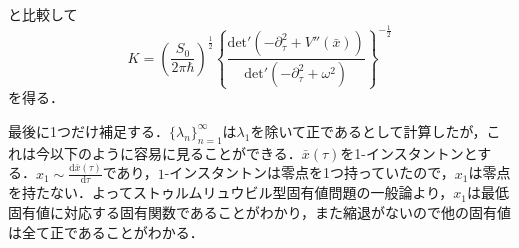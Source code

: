 \documentclass[a4paper,11pt]{jsarticle}
\begin{document}
と比較して
\begin{equation*}
K=\left(\frac{S_0}{2\pi\hbar}\right)^{\frac{1}{2}}\left\{\frac{\mathrm{det}'(-\partial_\tau^2+V''(\bar{x}))}{\mathrm{det}'(-\partial_\tau^2+\omega^2)}\right\}^{-\frac{1}{2}}
\end{equation*}
を得る．\par
最後に1つだけ補足する．$\{\lambda_n\}_{n=1}^\infty$は$\lambda_1$を除いて正であるとして計算したが，これは今以下のように容易に見ることができる．$\bar{x}(\tau)$を1-インスタントンとする．$x_1\sim\frac{\mathrm{d}\bar{x}(\tau)}{\mathrm{d}\tau}$であり，$1$-インスタントンは零点を1つ持っていたので，$x_1$は零点を持たない．よってストゥルムリュウビル型固有値問題の一般論より，$x_1$は最低固有値に対応する固有関数であることがわかり，また縮退がないので他の固有値は全て正であることがわかる．
%
%
%
\end{document}
